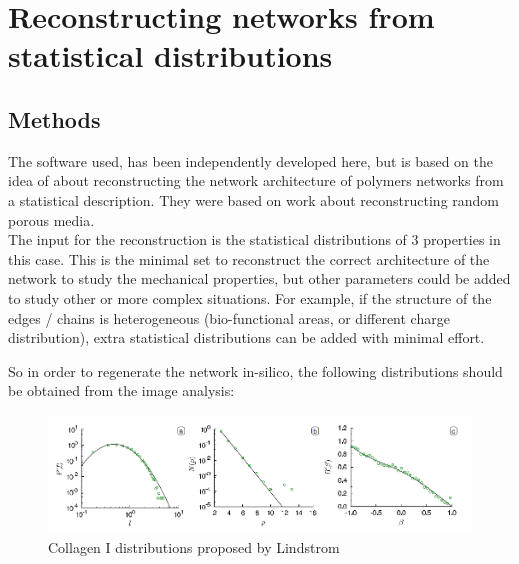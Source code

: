 
\chapter{Reconstructing networks from statistical distributions} %

\label{Chapter-Reconstruction} %



\section{Methods}

The  software used, has been independently developed here, but is based on the
idea of \citet{lindstrom_biopolymer_2010} about reconstructing the network
architecture of polymers networks from a statistical description. They were
based on \citet{yeong_reconstructing_1998,yeong_reconstructing_1998-1} work
about  reconstructing random porous media.\\
The input for the reconstruction is the
statistical distributions of $3$ properties in this case. This is the minimal 
set to reconstruct the correct architecture of the network to study the
mechanical properties, but other parameters could be added to study other or
more complex situations.  For example, if the structure of the edges / chains is
heterogeneous  (bio-functional areas, or different charge distribution), extra
statistical distributions can be added with minimal effort.

So in order to regenerate the network in-silico, the following distributions
should be obtained from the image analysis:
\begin{figure}[h!]
\begin{center}
\includegraphics[width=1.0\textwidth]{Figures/chapter-reconstruct/lindstrom-paper-images.png}

\caption[Collagen distributions]{Collagen I distributions proposed by Lindstrom
\citep{lindstrom_biopolymer_2010}}

\end{center}
\end{figure}

